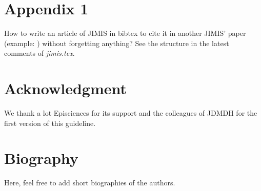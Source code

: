 \documentclass{jimis-en}
\begin{document}



\appendix\footnotesize

\section{Appendix 1}
How to write an article of JIMIS in bibtex to cite it in another JIMIS' paper (example: \citet{jimis}) without forgetting anything? See the structure in the latest comments of \textit{jimis.tex}.

\section{Acknowledgment}
We thank a lot Episciences for its support and the colleagues of JDMDH for the first version of this guideline.

\section{Biography}
Here, feel free to add short biographies of the authors.
\end{document}
